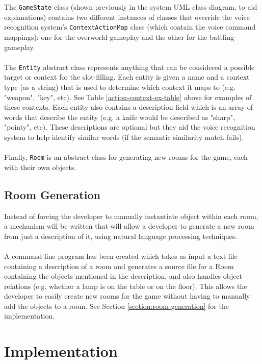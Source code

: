 \documentclass[11pt]{article}
\begin{document}
The \texttt{GameState} class (shown previously in the system UML class diagram, to aid explanations) contains two different instances of classes that override the voice recognition system's \texttt{ContextActionMap} class (which contain the voice command mappings): one for the overworld gameplay and the other for the battling gameplay.
\\
\\
The \texttt{Entity} abstract class represents anything that can be considered a possible target or context for the slot-filling. Each entity is given a name and a context type (as a string) that is used to determine which context it maps to (e.g. "weapon", "key", etc). See Table \ref{action-context-ex-table} above for examples of these contexts. Each entity also contains a description field which is an array of words that describe the entity (e.g. a knife would be described as "sharp", "pointy", etc). These descriptions are optional but they aid the voice recognition system to help identify similar words (if the semantic similarity match fails).
\\
\\
Finally, \texttt{Room} is an abstract class for generating new rooms for the game, each with their own objects.

\subsection{Room Generation}

Instead of forcing the developer to manually instantiate object within each room, a mechanism will be written that will allow a developer to generate a new room from just a description of it, using natural language processing techniques.
\\
\\
A command-line program has been created which takes as input a text file containing a description of a room and generates a source file for a Room containing the objects mentioned in the description, and also handles object relations (e.g. whether a lamp is on the table or on the floor). This allows the developer to easily create new rooms for the game without having to manually add the objects to a room. See Section \ref{section:room-generation} for the implementation.

\newpage
\section{Implementation}
\end{document}
